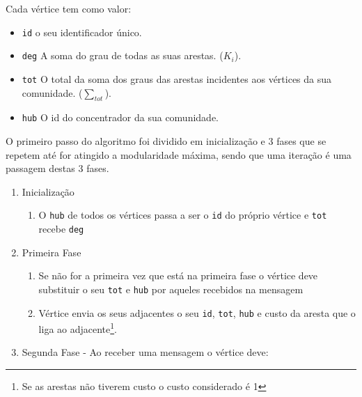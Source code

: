 \documentclass[a4paper,10pt]{report}
\begin{document}
Cada vértice tem como valor:
\begin{itemize}
	\item \verb|id| o seu identificador único.
	\item \verb|deg| A soma do grau de todas as suas arestas. ($K_i$).
	\item \verb|tot| O total da soma dos graus das arestas incidentes aos vértices da sua comunidade. ($\sum_{tot}$).
	\item \verb|hub| O id do concentrador da sua comunidade.
\end{itemize}

O primeiro passo do algoritmo foi dividido em inicialização e 3 fases que se repetem até for atingido a modularidade máxima, sendo que uma iteração é uma passagem destas 3 fases.

\begin{algorithm}[H]
\begin{minipage}{\textwidth}
\caption{Louvain \textit{Method} Distribuido Passo 1}
\label{alg:lmdPasso1}
\begin{enumerate}
  \item Inicialização
			\begin{enumerate}
				\item O \verb|hub| de todos os vértices passa a ser o \verb|id| do próprio vértice e \verb|tot| 				recebe \verb|deg|
			\end{enumerate}
	\item Primeira Fase
	\begin{enumerate}
	\item Se não for a primeira vez que está na primeira fase o vértice deve substituir o seu \verb|tot| e \verb|hub| por aqueles recebidos na mensagem
	\item Vértice envia os seus adjacentes o seu \verb|id|, \verb|tot|, \verb|hub| e custo da aresta que o liga ao adjacente\footnote{Se as arestas não tiverem custo o custo considerado é 1}.
	\end{enumerate}
	
  \item Segunda Fase -  Ao receber uma mensagem o vértice deve:
  

\end{enumerate}
\end{minipage}
\end{algorithm}
\end{document}
